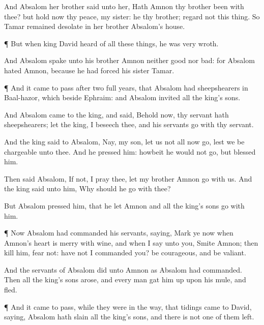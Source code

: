 {And
Absalom her
brother
said unto her, Hath
Amnon thy
brother been with thee? but hold now thy
peace, my
sister: he
{} thy
brother;
regard not this
thing. So
Tamar
remained
desolate in her
brother
Absalom’s
house.


\par }{\PP {}¶ But when
king
David
heard of all these
things, he was
very
wroth.

And
Absalom
spake unto his brother
Amnon neither
good nor
bad: for
Absalom
hated
Amnon,
because he had
forced his
sister
Tamar.


\par }{\PP {}¶ And it came to pass after two
full
years, that
Absalom had
sheepshearers in
Baal-hazor, which
{} beside
Ephraim: and
Absalom
invited all the
king’s
sons.

And
Absalom
came to the
king, and
said, Behold now, thy
servant hath
sheepshearers;
let the
king, I beseech thee, and his
servants
go with thy
servant.

And the
king
said to
Absalom, Nay, my
son, let us not all now
go, lest we be
chargeable unto thee. And he
pressed him: howbeit he
would not
go, but
blessed him.

Then
said
Absalom, If not, I pray thee, let my
brother
Amnon
go with us. And the
king
said unto him, Why should he
go with thee?

But
Absalom
pressed him, that he let
Amnon and all the
king’s
sons
go with him.


\par }{\PP {}¶ Now
Absalom had
commanded his
servants,
saying,
Mark ye now when
Amnon’s
heart is
merry with
wine, and when I
say unto you,
Smite
Amnon; then
kill him,
fear not: have not I
commanded you? be
courageous, and be
valiant.

And the
servants of
Absalom
did unto
Amnon as
Absalom had
commanded. Then all the
king’s
sons
arose, and every
man gat him
up upon his
mule, and
fled.


\par }{\PP {}¶ And it came to pass, while they were in the
way, that
tidings
came to
David,
saying,
Absalom hath
slain all the
king’s
sons, and there is not
one of them
left.

}
